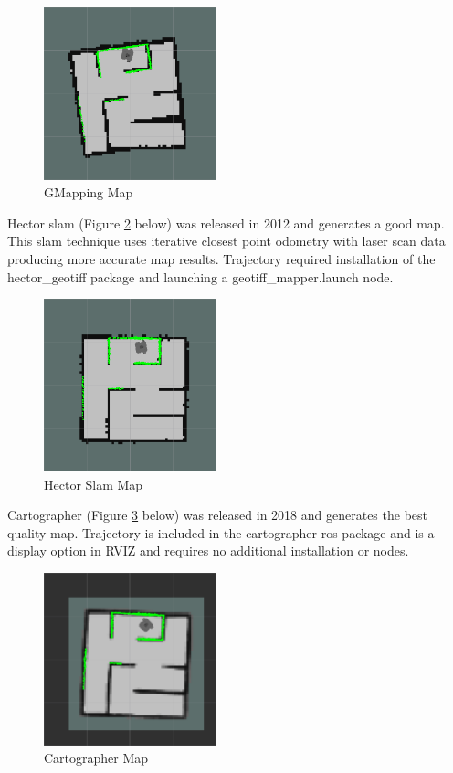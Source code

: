 \documentclass[11pt, a4, nocenter, margin=150mm]{article}
\begin{document}
		\begin{figure}[h!]
			\centering
			\includegraphics[width=50mm]{../slam/gmapping_1.png}
			\caption{GMapping Map}
			\label{fig:gmap_result}
		\end{figure}


		Hector slam (Figure \ref{fig:hector_result} below) was released in 2012 and generates a good map. This slam technique uses iterative closest point odometry with laser scan data producing more accurate map results. Trajectory required installation of the hector\_geotiff package and launching a geotiff\_mapper.launch node.

		\begin{figure}[h!]
			\centering
			\includegraphics[width=50mm]{../slam/hector_1.png}
			\caption{Hector Slam Map}
			\label{fig:hector_result}
		\end{figure}

		Cartographer (Figure \ref{fig:cartographer_result} below) was released in 2018 and generates the best quality map. Trajectory is included in the cartographer-ros package and is a display option in RVIZ and requires no additional installation or nodes.

		\begin{figure}[h!]
			\centering
			\includegraphics[width=50mm]{../slam/cartographer_1.png}
			\caption{Cartographer Map}
			\label{fig:cartographer_result}
		\end{figure}
\end{document}
